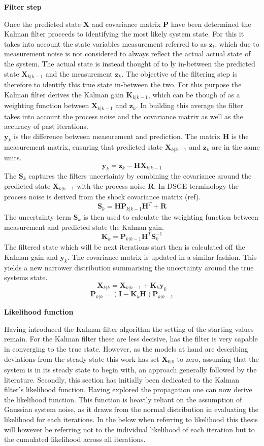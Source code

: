 \documentclass[12pt,a4paper,english]{article} %
\newcommand{\matr}[1]{\mathbf{#1}} %
\begin{document}
	\textbf{Filter step}
		
	Once the predicted state $\matr X$ and covariance matrix $\matr P$ have been determined the Kalman filter proceeds to identifying the most likely system state. For this it takes into account the state variables measurement referred to as $\matr z_t$, which due to measurement noise is not considered to always reflect the actual actual state of the system. The actual state is instead thought of to ly in-between the predicted state $\matr{X}_{k| k-1}$ and the measurement $\matr{z}_k$. The objective of the filtering step is therefore to identify this true state in-between the two. For this purpose the Kalman filter derives the Kalman gain $\matr{K}_{k| k-1}$, which can be though of as a weighting function between $\matr{X}_{k| k-1}$ and $\matr{z}_k$. In building this average the filter takes into account the process noise and the covariance matrix as well as the accuracy of past iterations.\\
	
	$\matr{y}_k$ is the difference between measurement and prediction. The matrix $\matr H$ is the measurement matrix, ensuring that predicted state $\matr{X}_{k| k-1}$ and $\matr{z}_k$ are in the same units.
	\[
		\matr{y}_{k} = \matr{z}_k - \matr H \matr{X}_{k| k-1}
	\]
	The	$\matr{S}_k$ captures the filters uncertainty by combining the covariance around the predicted state $\matr{X}_{k| k-1}$ with the process noise $\matr{R}$. In DSGE terminology the process noise is derived from the shock covariance matrix (ref).
	\[
		\matr{S}_k = \matr H \matr{P}_{k| k-1} \matr{H}^T + \matr{R}
	\]
	The uncertainty term $\matr{S}_{k}$ is then used to calculate the weighting function between measurement and predicted state the Kalman gain. 
	\[
		\matr{K}_k = \matr{P}_{k| k-1} \matr{H}^T \matr{S}_{k}^{-1}
	\]
	The filtered state which will be next iterations start then is calculated off the Kalman gain and $\matr{y}_k$. The covariance matrix is updated in a similar fashion. This yields a new narrower distribution summarising the uncertainty around the true systems state.
	\[
		\matr{X}_{k|k} = \matr{X}_{k| k-1} + \matr{K}_k \matr{y}_k
	\]
	\[
		\matr{P}_{k|k} = (\matr I - \matr{K}_k \matr{H}) \matr{P}_{k|k-1}
	\]
	
	\textbf{Likelihood function}
	
	Having introduced the Kalman filter algorithm the setting of the starting values remain. For the Kalman filter these are less decisive, has the filter is very capable in converging to the true state. However, as the models at hand are describing deviations from the steady state this work has set $\matr{X}_{0|0}$ to zero, assuming that the system is in its steady state to begin with, an approach generally followed by the literature. Secondly, this section has initially been dedicated to the Kalman filter's likelihood function. Having explored the propagation one can now derive the likelihood function. This function is heavily reliant on the assumption of Gaussian system noise, as it draws from the normal distribution in evaluating the likelihood for each iterations. In the below when referring to likelihood this thesis will however be referring not to the individual likelihood of each iteration but to the cumulated likelihood across all iterations.
	
\end{document}
